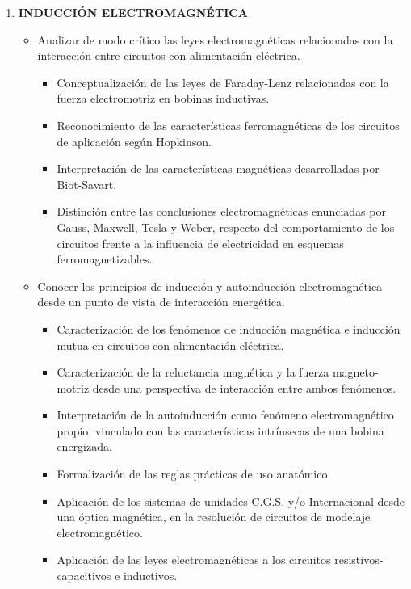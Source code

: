 \documentclass[a4paper,12pt]{article}
\begin{document}
\begin{enumerate}[label=\textbf{\arabic*.}, leftmargin=*]
    \item \textbf{INDUCCIÓN ELECTROMAGNÉTICA}
    \begin{itemize}[leftmargin=*, nosep]
        \item Analizar de modo crítico las leyes electromagnéticas relacionadas con la interacción entre circuitos con alimentación eléctrica.
        \begin{itemize}
            \item Conceptualización de las leyes de Faraday-Lenz relacionadas con la fuerza electromotriz en bobinas inductivas.
            \item Reconocimiento de las características ferromagnéticas de los circuitos de aplicación según Hopkinson.
            \item Interpretación de las características magnéticas desarrolladas por Biot-Savart.
            \item Distinción entre las conclusiones electromagnéticas enunciadas por Gauss, Maxwell, Tesla y Weber, respecto del comportamiento de los circuitos frente a la influencia de electricidad en esquemas ferromagnetizables.
        \end{itemize}
        \item Conocer los principios de inducción y autoinducción electromagnética desde un punto de vista de interacción energética.
        \begin{itemize}
            \item Caracterización de los fenómenos de inducción magnética e inducción mutua en circuitos con alimentación eléctrica.
            \item Caracterización de la reluctancia magnética y la fuerza magneto-motriz desde una perspectiva de interacción entre ambos fenómenos.
            \item Interpretación de la autoinducción como fenómeno electromagnético propio, vinculado con las características intrínsecas de una bobina energizada.
            \item Formalización de las reglas prácticas de uso anatómico.
            \item Aplicación de los sistemas de unidades C.G.S. y/o Internacional desde una óptica magnética, en la resolución de circuitos de modelaje electromagnético.
            \item Aplicación de las leyes electromagnéticas a los circuitos resistivos-capacitivos e inductivos.
        \end{itemize}
    \end{itemize}


\end{enumerate}
\end{document}
